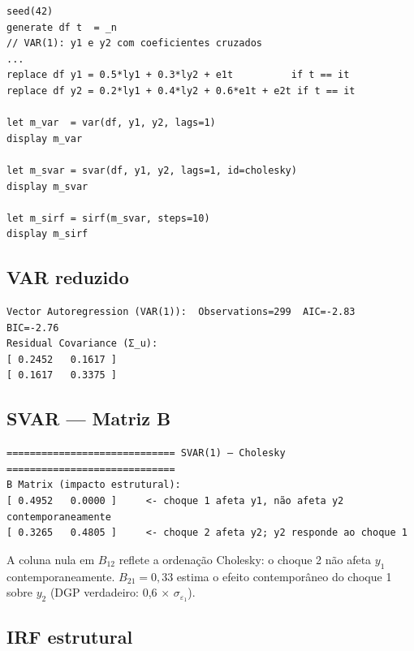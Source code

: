 \begin{lstlisting}[caption={DGP estrutural e SVAR Cholesky}]
seed(42)
generate df t  = _n
// VAR(1): y1 e y2 com coeficientes cruzados
...
replace df y1 = 0.5*ly1 + 0.3*ly2 + e1t          if t == it
replace df y2 = 0.2*ly1 + 0.4*ly2 + 0.6*e1t + e2t if t == it

let m_var  = var(df, y1, y2, lags=1)
display m_var

let m_svar = svar(df, y1, y2, lags=1, id=cholesky)
display m_svar

let m_sirf = sirf(m_svar, steps=10)
display m_sirf
\end{lstlisting}

\subsection*{VAR reduzido}

\begin{lstlisting}[language={}, basicstyle=\ttfamily\small,
  frame=none, numbers=none, backgroundcolor=\color{codbg},
  xleftmargin=0pt, xrightmargin=0pt, breaklines=false]
Vector Autoregression (VAR(1)):  Observations=299  AIC=-2.83  BIC=-2.76
Residual Covariance (Σ_u):
[ 0.2452   0.1617 ]
[ 0.1617   0.3375 ]
\end{lstlisting}

\subsection*{SVAR — Matriz B}

\begin{lstlisting}[language={}, basicstyle=\ttfamily\small,
  frame=none, numbers=none, backgroundcolor=\color{codbg},
  xleftmargin=0pt, xrightmargin=0pt, breaklines=false]
============================= SVAR(1) — Cholesky =============================
B Matrix (impacto estrutural):
[ 0.4952   0.0000 ]     <- choque 1 afeta y1, não afeta y2 contemporaneamente
[ 0.3265   0.4805 ]     <- choque 2 afeta y2; y2 responde ao choque 1
\end{lstlisting}

A coluna nula em $B_{12}$ reflete a ordenação Cholesky: o choque 2 não afeta
$y_1$ contemporaneamente. $B_{21} = 0{,}33$ estima o efeito contemporâneo do
choque 1 sobre $y_2$ (DGP verdadeiro: 0{,}6 $\times$ $\sigma_{\varepsilon_1}$).

\subsection*{IRF estrutural}

